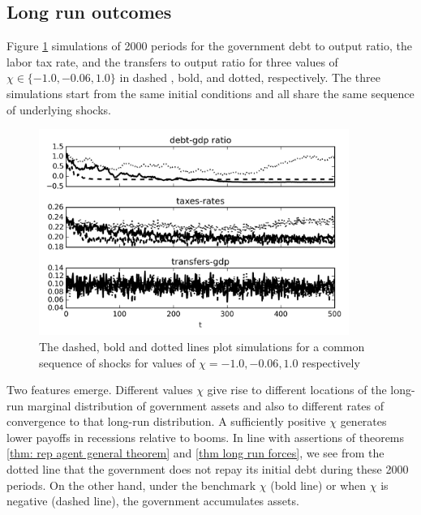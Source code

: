 \documentclass[thmsb,11pt]{article}
\begin{document}
\subsection{Long run outcomes}\label{sec:longrunsimul}
Figure \ref{fig:long_simulation} simulations of  2000 periods for the government debt to output ratio, the labor tax rate,  and the transfers to output ratio
for three values of $\chi \in \{-1.0,-0.06,1.0\}$ in dashed , bold, and dotted, respectively. The three simulations start from the  same initial conditions and
all share the same sequence of underlying shocks.

 {
  \begin{figure}

    \centering
    \includegraphics[width = 0.9\textwidth]{cesplots/long_simulation_debt.png}
    \caption{The dashed, bold and dotted lines plot simulations for a common sequence of shocks for values of $\chi=-1.0,-0.06,1.0$ respectively}
      \label{fig:long_simulation}
  \end{figure}

}

Two features emerge. Different values $\chi$ give rise to different locations of the long-run marginal distribution of government assets and also to different  rates  of convergence
to that long-run distribution.
A sufficiently positive $\chi$ generates lower payoffs in recessions relative to booms. In line with assertions of  theorems \ref{thm: rep agent general theorem} and  \ref{thm long run forces},
we see from the dotted line  that  the government does not repay its initial debt during these 2000 periods. On the other
hand, under the benchmark $\chi$  (bold line) or  when $\chi$ is negative (dashed line), the government accumulates assets.
\end{document}
